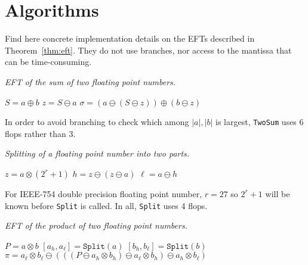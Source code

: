 \chapter{Algorithms}\label{chap:appendix-algo}

Find here concrete implementation details on the EFTs described
in Theorem~\ref{thm:eft}. They do not use branches, nor access to the
mantissa that can be time-consuming.

\begin{breakablealgorithm}
  \caption{\textit{EFT of the sum of two floating point numbers.}}

  \begin{algorithmic}
      \State \(S = a \oplus b\)
      \State \(z = S \ominus a\)
      \State \(\sigma = (a \ominus (S \ominus z)) \oplus (b \ominus z)\)
    \EndFunction
  \end{algorithmic}
\end{breakablealgorithm}

\noindent In order to avoid branching to check which among
\(\left|a\right|, \left|b\right|\) is largest, \texttt{TwoSum} uses 6 flops
rather than 3.

\begin{breakablealgorithm}
  \caption{\textit{Splitting of a floating point number into two parts.}}

  \begin{algorithmic}
      \State \(z = a \otimes (2^r + 1)\)
      \State \(h = z \ominus (z \ominus a)\)
      \State \(\ell = a \ominus h\)
    \EndFunction
  \end{algorithmic}
\end{breakablealgorithm}

\noindent For IEEE-754 double precision floating point number, \(r = 27\)
so \(2^r + 1\) will be known before \texttt{Split} is called. In all,
\texttt{Split} uses 4 flops.

\begin{breakablealgorithm}
  \caption{\textit{EFT of the product of two floating point numbers.}}

  \begin{algorithmic}
      \State \(P = a \otimes b\)
      \State \(\left[a_h, a_{\ell}\right] = \mathtt{Split}(a)\)
      \State \(\left[b_h, b_{\ell}\right] = \mathtt{Split}(b)\)
      \State \(\pi = a_{\ell} \otimes b_{\ell} \ominus (((P \ominus
          a_h \otimes b_h)
          \ominus a_{\ell} \otimes b_h) \ominus a_h \otimes b_{\ell})\)
    \EndFunction
  \end{algorithmic}
\end{breakablealgorithm}

